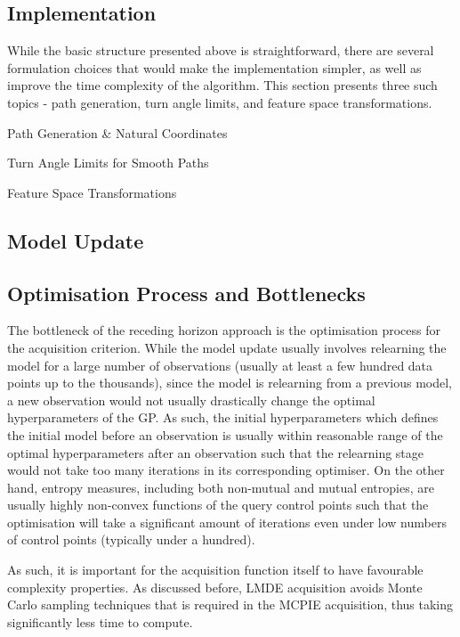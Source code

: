 		\subsection{Implementation}

			While the basic structure presented above is straightforward, there are several formulation choices that would make the implementation simpler, as well as improve the time complexity of the algorithm. This section presents three such topics - path generation, turn angle limits, and feature space transformations.
			
			Path Generation \& Natural Coordinates
			
			Turn Angle Limits for Smooth Paths
			
			Feature Space Transformations
	
		\subsection{Model Update}
				
		\subsection{Optimisation Process and Bottlenecks}
		
			The bottleneck of the receding horizon approach is the optimisation process for the acquisition criterion. While the model update usually involves relearning the model for a large number of observations (usually at least a few hundred data points up to the thousands), since the model is relearning from a previous model, a new observation would not usually drastically change the optimal hyperparameters of the GP. As such, the initial hyperparameters which defines the initial model before an observation is usually within reasonable range of the optimal hyperparameters after an observation such that the relearning stage would not take too many iterations in its corresponding optimiser. On the other hand, entropy measures, including both non-mutual and mutual entropies, are usually highly non-convex functions of the query control points such that the optimisation will take a significant amount of iterations even under low numbers of control points (typically under a hundred).
			
			As such, it is important for the acquisition function itself to have favourable complexity properties. As discussed before, LMDE acquisition avoids Monte Carlo sampling techniques that is required in the MCPIE acquisition, thus taking significantly less time to compute.
			
